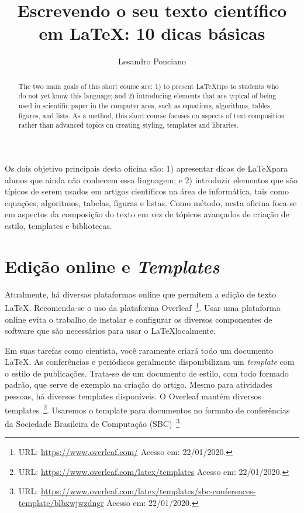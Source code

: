 \documentclass[12pt]{article}
\title{Escrevendo o seu texto científico em \LaTeX: 10 dicas básicas}
\author{Lesandro Ponciano\inst{1}}
\begin{document}
 

\maketitle

\begin{abstract}
  The two main goals of this short course are: 1) to present \LaTeX tips to students who do not yet know this language; and 2) introducing elements that are typical of being used in scientific paper in the computer area, such as equations, algorithms, tables, figures, and lists. As a method, this short course focuses on aspects of text composition rather than advanced topics on creating styling, templates and libraries.
\end{abstract}
     
\begin{resumo} 
  Os dois objetivo principais desta oficina são: 1) apresentar dicas de \LaTeX para alunos que ainda não conhecem essa linguagem; e 2) introduzir elementos que são típicos de serem usados em artigos científicos na área de informática, tais como equações, algoritmos, tabelas, figuras e listas. Como método, nesta oficina foca-se em aspectos da composição do texto em vez de tópicos avançados de criação de estilo, templates e bibliotecas.
\end{resumo}


\section{Edição online e \textit{Templates}}

Atualmente, há diversas plataformas online que permitem a edição de texto \LaTeX. Recomenda-se o uso da plataforma Overleaf~\footnote{URL: \url{https://www.overleaf.com/} Acesso em: 22/01/2020.}. Usar uma plataforma online evita o trabalho de instalar e configurar os diversos componentes de software que são necessários para usar o \LaTeX localmente.

Em suas tarefas como cientista, você raramente criará todo um documento \LaTeX. As conferências e periódicos geralmente disponibilizam um \textit{template} com o estilo de publicações. Trata-se de um documento de estilo, com todo formado padrão, que serve de exemplo na criação do artigo. Mesmo para atividades pessoas, há diversos templates disponíveis. O Overleaf mantém diversos templates~\footnote{URL: \url{https://www.overleaf.com/latex/templates} Acesso em: 22/01/2020.}. Usaremos o template para documentos no formato de conferências da  Sociedade Brasileira de Computação (SBC)~\footnote{URL: \url{https://www.overleaf.com/latex/templates/sbc-conferences-template/blbxwjwzdngr} Acesso em: 22/01/2020.}
\end{document}
